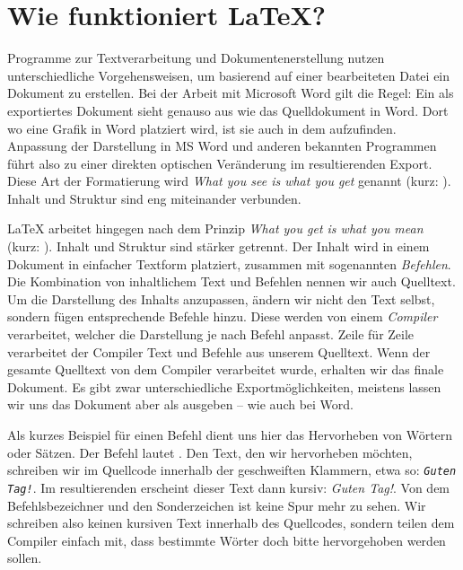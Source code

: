 \chapter{Wie funktioniert \LaTeX?}
\label{sec:basic-functionality}

Programme zur Textverarbeitung und Dokumentenerstellung nutzen unterschiedliche Vorgehensweisen, um basierend auf einer bearbeiteten Datei ein Dokument zu erstellen.
Bei der Arbeit mit Microsoft Word gilt die Regel: Ein als  exportiertes Dokument sieht genauso aus wie das Quelldokument in Word. Dort wo eine Grafik in Word platziert wird, ist sie auch in dem  aufzufinden. Anpassung der Darstellung in MS Word und anderen bekannten Programmen führt also zu einer direkten optischen Veränderung im resultierenden Export. Diese Art der Formatierung wird \emph{What you see is what you get} genannt (kurz: ). Inhalt und Struktur sind eng miteinander verbunden.

\LaTeX{} arbeitet hingegen nach dem Prinzip \emph{What you get is what you mean} (kurz: ). Inhalt und Struktur sind stärker getrennt.
Der Inhalt wird in einem Dokument in einfacher Textform platziert, zusammen mit sogenannten \emph{Befehlen}. Die Kombination von inhaltlichem Text und Befehlen nennen wir auch Quelltext. Um die Darstellung des Inhalts anzupassen, ändern wir nicht den Text selbst, sondern fügen entsprechende Befehle hinzu. Diese werden von einem \emph{Compiler} verarbeitet, welcher die Darstellung je nach Befehl anpasst. Zeile für Zeile verarbeitet der Compiler Text und Befehle aus unserem Quelltext. Wenn der gesamte Quelltext von dem Compiler verarbeitet wurde, erhalten wir das finale Dokument. Es gibt zwar unterschiedliche Exportmöglichkeiten, meistens lassen wir uns das Dokument aber als  ausgeben -- wie auch bei Word.

Als kurzes Beispiel für einen Befehl dient uns hier das Hervorheben von Wörtern oder Sätzen. Der Befehl lautet \texttt{\emph{}}. Den Text, den wir hervorheben möchten, schreiben wir im Quellcode innerhalb der geschweiften Klammern, etwa so: \texttt{\emph{Guten Tag!}}. Im resultierenden  erscheint dieser Text dann kursiv: \emph{Guten Tag!}. Von dem Befehlsbezeichner und den Sonderzeichen ist keine Spur mehr zu sehen. Wir schreiben also keinen kursiven Text innerhalb des Quellcodes, sondern teilen dem Compiler einfach mit, dass bestimmte Wörter doch bitte hervorgehoben werden sollen.

